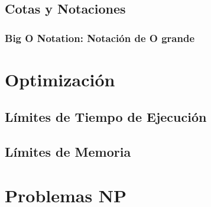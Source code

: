 \documentclass[12pt, fleqn]{report}                             %
\theoremstyle{break}                                            %
\begin{document}
        \section{Cotas y Notaciones}

            \subsection{Big O Notation: Notación de O grande}



    \clearpage
    \chapter{Optimización}

        \section{Límites de Tiempo de Ejecución}

        \section{Límites de Memoria}



    \clearpage
    \chapter{Problemas NP}
\end{document}
